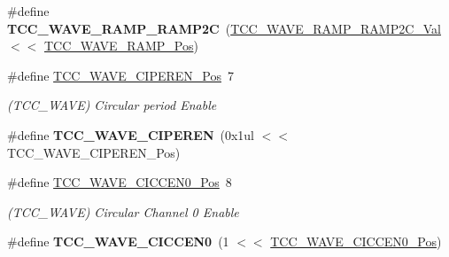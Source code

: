 \begin{DoxyCompactItemize}
\item 
\hypertarget{group___s_a_m_l21___t_c_c_ga15e62604d1e91a4946f2cf71364f8a8c}{}\#define {\bfseries T\+C\+C\+\_\+\+W\+A\+V\+E\+\_\+\+R\+A\+M\+P\+\_\+\+R\+A\+M\+P2\+C}~(\hyperlink{group___s_a_m_l21___t_c_c_gabe7904d0407ca7a3c78a7ac220e4e77a}{T\+C\+C\+\_\+\+W\+A\+V\+E\+\_\+\+R\+A\+M\+P\+\_\+\+R\+A\+M\+P2\+C\+\_\+\+Val}      $<$$<$ \hyperlink{group___s_a_m_l21___t_c_c_ga6613e2e13c814033e2509897a20ee96c}{T\+C\+C\+\_\+\+W\+A\+V\+E\+\_\+\+R\+A\+M\+P\+\_\+\+Pos})\label{group___s_a_m_l21___t_c_c_ga15e62604d1e91a4946f2cf71364f8a8c}

\item 
\hypertarget{group___s_a_m_l21___t_c_c_ga4a2bf2b11fbf07c55490852a953eb91b}{}\#define \hyperlink{group___s_a_m_l21___t_c_c_ga4a2bf2b11fbf07c55490852a953eb91b}{T\+C\+C\+\_\+\+W\+A\+V\+E\+\_\+\+C\+I\+P\+E\+R\+E\+N\+\_\+\+Pos}~7\label{group___s_a_m_l21___t_c_c_ga4a2bf2b11fbf07c55490852a953eb91b}

\begin{DoxyCompactList}\small\item\em (T\+C\+C\+\_\+\+W\+A\+V\+E) Circular period Enable \end{DoxyCompactList}\item 
\hypertarget{group___s_a_m_l21___t_c_c_ga3d03b57c4e98961178a6bdea5cbbc5a3}{}\#define {\bfseries T\+C\+C\+\_\+\+W\+A\+V\+E\+\_\+\+C\+I\+P\+E\+R\+E\+N}~(0x1ul $<$$<$ T\+C\+C\+\_\+\+W\+A\+V\+E\+\_\+\+C\+I\+P\+E\+R\+E\+N\+\_\+\+Pos)\label{group___s_a_m_l21___t_c_c_ga3d03b57c4e98961178a6bdea5cbbc5a3}

\item 
\hypertarget{group___s_a_m_l21___t_c_c_ga62691addf10a4e5ef29b1cb75abd58f7}{}\#define \hyperlink{group___s_a_m_l21___t_c_c_ga62691addf10a4e5ef29b1cb75abd58f7}{T\+C\+C\+\_\+\+W\+A\+V\+E\+\_\+\+C\+I\+C\+C\+E\+N0\+\_\+\+Pos}~8\label{group___s_a_m_l21___t_c_c_ga62691addf10a4e5ef29b1cb75abd58f7}

\begin{DoxyCompactList}\small\item\em (T\+C\+C\+\_\+\+W\+A\+V\+E) Circular Channel 0 Enable \end{DoxyCompactList}\item 
\hypertarget{group___s_a_m_l21___t_c_c_ga2bdb138e109ca720fc693e4cd61bed36}{}\#define {\bfseries T\+C\+C\+\_\+\+W\+A\+V\+E\+\_\+\+C\+I\+C\+C\+E\+N0}~(1 $<$$<$ \hyperlink{group___s_a_m_l21___t_c_c_ga62691addf10a4e5ef29b1cb75abd58f7}{T\+C\+C\+\_\+\+W\+A\+V\+E\+\_\+\+C\+I\+C\+C\+E\+N0\+\_\+\+Pos})\label{group___s_a_m_l21___t_c_c_ga2bdb138e109ca720fc693e4cd61bed36}


\end{DoxyCompactItemize}
